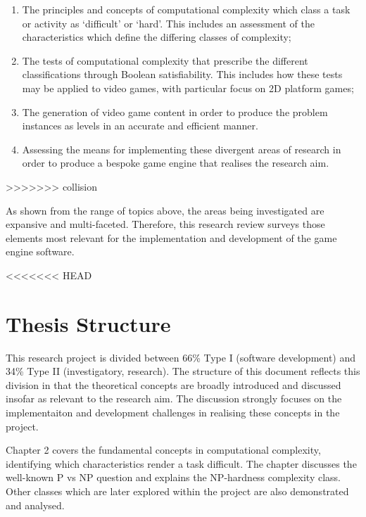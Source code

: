 \documentclass[11pt, a4paper, oneside]{report} %
\begin{document}
\begin{enumerate}

  \item The principles and concepts of computational complexity which class a task or activity as
  `difficult' or `hard'. This includes an assessment of the characteristics which define the
  differing classes of complexity;

  \item  The tests of computational complexity that prescribe the different classifications through
  Boolean satisfiability. This includes how these tests may be applied to video games, with
  particular focus on 2D platform games;

  \item The generation of video game content in order to produce the problem instances as levels in
  an accurate and efficient manner.

  \item Assessing the means for implementing these divergent areas of research in order to produce a
  bespoke game engine that realises the research aim.


\end{enumerate}
>>>>>>> collision

As shown from the range of topics above, the areas being investigated are
expansive and multi-faceted. Therefore, this research review surveys those
elements most relevant for the implementation and development of the game engine
software.

<<<<<<< HEAD
\section{Thesis Structure}

This research project is divided between 66\% Type I (software development) and
34\% Type II (investigatory, research). The structure of this document reflects
this division in that the theoretical concepts are broadly introduced and
discussed insofar as relevant to the research aim. The discussion strongly
focuses on the  implementaiton and development challenges in realising these
concepts in the project.

Chapter 2 covers the fundamental concepts in computational complexity,
identifying which characteristics render a task difficult. The chapter discusses
the well-known P vs NP question and explains the NP-hardness complexity class.
Other classes which are later explored within the project are also demonstrated
and analysed.
\end{document}
